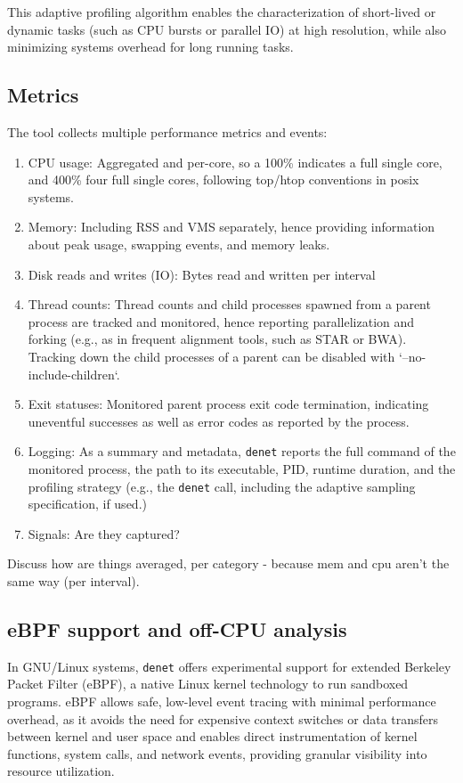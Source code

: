 \documentclass[10pt]{article}
\begin{document}
This adaptive profiling algorithm enables the characterization of short-lived or dynamic tasks (such as CPU bursts or parallel IO) at high resolution, while also minimizing systems overhead for long running tasks.

\subsection*{Metrics}

The tool collects multiple performance metrics and events:

\begin{enumerate}
    \item CPU usage: Aggregated and per-core, so a 100\% indicates a full single core, and 400\% four full single cores, following top/htop conventions in posix systems.
    \item Memory: Including RSS and VMS separately, hence providing information about peak usage, swapping events, and memory leaks.
    \item Disk reads and writes (IO): Bytes read and written per interval
    \item Thread counts: Thread counts and child processes spawned from a parent process are tracked and monitored, hence reporting parallelization and forking (e.g., as in frequent alignment tools, such as STAR or BWA). Tracking down the child processes of a parent can be disabled with `--no-include-children`. 
    \item Exit statuses: Monitored parent process exit code termination, indicating uneventful successes as well as error codes as reported by the process.
    \item Logging: As a summary and metadata, \texttt{denet} reports the full command of the monitored process, the path to its executable, PID, runtime duration, and the profiling strategy (e.g., the \texttt{denet} call, including the adaptive sampling specification, if used.)
    \item Signals: {\color{red}Are they captured?}
\end{enumerate}

{\color{red}Discuss how are things averaged, per category - because mem and cpu aren’t the same way (per interval).}

\subsection*{eBPF support and off-CPU analysis}

In GNU/Linux systems, \texttt{denet} offers experimental support for extended Berkeley Packet Filter (eBPF), a native Linux kernel technology to run sandboxed programs. eBPF allows safe, low-level event tracing with minimal performance overhead, as it avoids the need for expensive context switches or data transfers between kernel and user space and enables direct instrumentation of kernel functions, system calls, and network events, providing granular visibility into resource utilization. 
\end{document}
